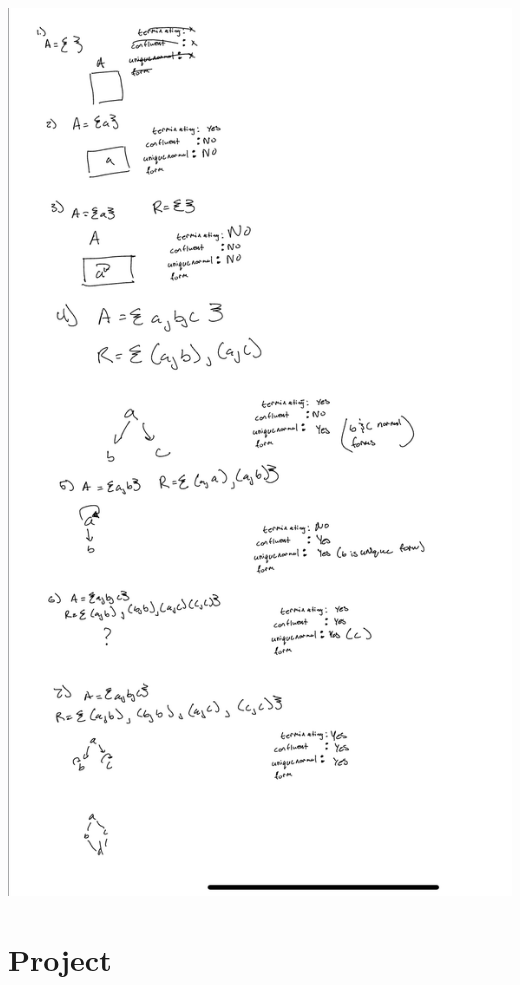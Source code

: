\documentclass{article}
\theoremstyle{theorem}
\theoremstyle{definition}
\theoremstyle{remark}
\begin{document}
\item \includegraphics[scale=0.2]{hw7.jpg}
\section{Project}\label{Project}
\end{document}
